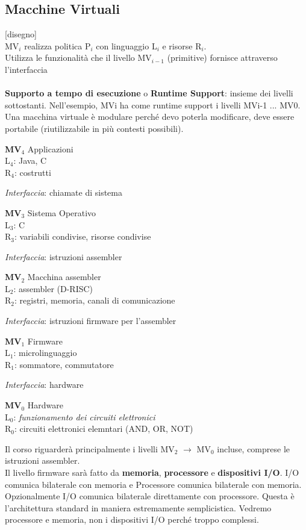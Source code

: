 \documentclass[10pt]{article}
\begin{document}
\subsection{Macchine Virtuali}
[disegno]\\
MV$_{i}$ realizza politica P$_{i}$ con linguaggio L$_{i}$ e risorse R$_{i}$.\\Utilizza le funzionalità che il livello MV$_{i-1}$ (primitive) fornisce attraverso l'interfaccia\\\\
\textbf{Supporto a tempo di esecuzione} o \textbf{Runtime Support}: insieme dei livelli sottostanti. Nell'esempio, MVi ha come runtime support i livelli MVi-1 ... MV0.
Una macchina virtuale è modulare perché devo poterla modificare, deve essere portabile (riutilizzabile in più contesti possibili).
\begin{list}{}{}
\item \textbf{MV$_{4}$} Applicazioni\\L$_{4}$: Java, C\\R$_{4}$: costrutti
\item \textit{Interfaccia}: chiamate di sistema
\item \textbf{MV$_{3}$} Sistema Operativo\\L$_{3}$: C\\R$_{3}$: variabili condivise, risorse condivise
\item \textit{Interfaccia}: istruzioni assembler
\item \textbf{MV$_{2}$} Macchina assembler\\L$_{2}$: assembler (D-RISC)\\R$_{2}$: registri, memoria, canali di comunicazione
\item \textit{Interfaccia}: istruzioni firmware per l'assembler
\item \textbf{MV$_{1}$} Firmware\\L$_{1}$: microlinguaggio\\R$_{1}$: sommatore, commutatore
\item \textit{Interfaccia}: hardware
\item \textbf{MV$_{0}$} Hardware\\L$_{0}$: \textit{funzionamento dei circuiti elettronici}\\R$_{0}$: circuiti elettronici elemntari (AND, OR, NOT) 
\end{list}
Il corso riguarderà principalmente i livelli MV$_{2}$ $\rightarrow$ MV$_{0}$ incluse, comprese le istruzioni assembler.\\
Il livello firmware sarà fatto da \textbf{memoria}, \textbf{processore} e \textbf{dispositivi I/O}. I/O comunica bilaterale con memoria e Processore comunica bilaterale con memoria. Opzionalmente I/O comunica bilaterale direttamente con processore. Questa è l'architettura standard in maniera estremamente semplicistica.
Vedremo processore e memoria, non i dispositivi I/O perché troppo complessi.
\end{document}
